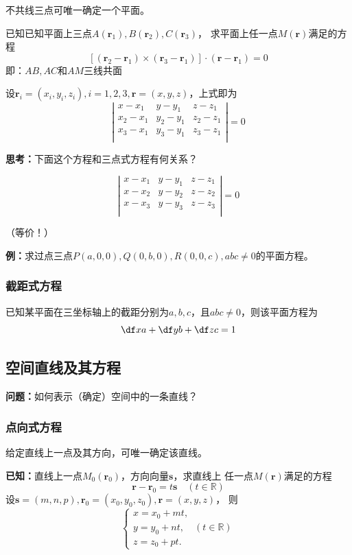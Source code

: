 不共线三点可唯一确定一个平面。

已知已知平面上三点$A(\bm{r}_1),B(\bm{r}_2),C(\bm{r}_3)$，
求平面上任一点$M(\bm{r})$满足的方程
$$[(\bm{r}_2-\bm{r}_1)\times(\bm{r}_3-\bm{r}_1)]\cdot(\bm{r}-\bm{r}_1)=0$$
即：$AB,AC$和$AM$三线共面

设$\bm{r}_i=(x_i,y_i,z_i),i=1,2,3,\bm{r}=(x,y,z)$，上式即为
$$\left|\begin{array}{ccc}
x-x_1 & y-y_1 & z-z_1\\
x_2-x_1 & y_2-y_1 & z_2-z_1\\
x_3-x_1 & y_3-y_1 & z_3-z_1\\
\end{array}\right|
=0
$$

{\bf 思考：}下面这个方程和三点式方程有何关系？

$$\left|\begin{array}{ccc}
x-x_1 & y-y_1 & z-z_1\\
x-x_2 & y-y_2 & z-z_2\\
x-x_3 & y-y_3 & z-z_3\\
\end{array}\right|
=0
$$

\hfill （等价！）
 
{\bf 例：}求过点三点$P(a,0,0),Q(0,b,0),R(0,0,c),abc\ne0$的平面方程。

\subsubsection{截距式方程}

已知某平面在三坐标轴上的截距分别为$a,b,c$，且$abc\ne 0$，则该平面方程为
$$\df xa+\df yb+\df zc=1$$

\subsection{空间直线及其方程}

{\bf 问题：}如何表示（确定）空间中的一条直线？

\subsubsection{点向式方程}

给定直线上一点及其方向，可唯一确定该直线。

{\bf 已知：}直线上一点$M_0(\bm{r}_0)$，方向向量$\bm{s}$，求直线上
任一点$M(\bm{r})$满足的方程 
$${\bm{r}-\bm{r}_0=t\bm{s}\quad(t\in\mathbb{R})}$$ 
设$\bm{s}=(m,n,p),\bm{r}_0=(x_0,y_0,z_0),\bm{r}=(x,y,z)$， 则
$$
	{\left\{\begin{array}{l}
		x=x_0+mt,\\
		y=y_0+nt,\quad (t\in\mathbb{R})\\
		z=z_0+pt.
	\end{array}\right.}
$$

